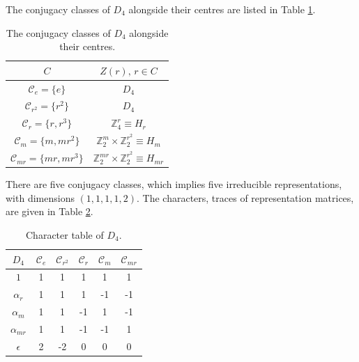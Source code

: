 \documentclass[two column]{article}
\begin{document}
The conjugacy classes of $D_4$ alongside their centres are listed in Table \ref{tab:conjs}.
\begin{table}[h]
\centering    \begin{tabular}{|c | c|}\hline
         $C$ & $Z(r) \text{, } r\in C$\\ \hline $\mathcal C_e = \{e\}$ & $D_4$\\ $\mathcal C_{r^2}= \{r^2\}$ & $D_4$\\ $\mathcal C_{r}=\{r, r^3\}$ & $\mathbb{Z}_4^r \equiv H_r$\\ $\mathcal C_m=\{m, mr^2\}$& $\mathbb{Z}_2^m \times \mathbb{Z}_2^{r^2}\equiv H_m$ \\ $\mathcal C_{mr}=\{mr, mr^3\}$& $\mathbb{Z}_2^{mr} \times \mathbb{Z}_2^{r^2}\equiv H_{mr}$\\
         \hline 
    \end{tabular}
    \caption{The conjugacy classes of $D_4$ alongside their centres.}\label{tab:conjs}
\end{table}
There are five conjugacy classes, which implies five irreducible representations, with dimensions $(1,1,1,1,2)$. The characters, traces of representation matrices, are given in Table \ref{tab:char}.
\begin{table}[h]
\centering    \begin{tabular}{|c|c c c c c |}
         \hline
         $D_4$ & $\mathcal C_e$ & $\mathcal C_{r^2}$ & $\mathcal C_{r}$ & $\mathcal C_m$ & $\mathcal C_{mr}$ \\
         \hline
         $1$ & 1 & 1 & 1 & 1 & 1 \\
         $\alpha_r $& 1 & 1 & 1 & -1 & -1  \\
         $\alpha_{m}$ & 1 & 1 & -1 & 1 & -1  \\
         $\alpha_{mr}$ & 1 & 1 & -1 & -1 & 1  \\
         $\epsilon$ & 2 & -2 & 0 & 0 & 0  \\
         \hline 
    \end{tabular}
    \caption{Character table of $D_4$.}\label{tab:char}
\end{table}
\end{document}
